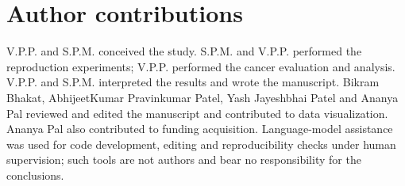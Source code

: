 \section*{Author contributions}
V.P.P. and S.P.M. conceived the study. S.P.M. and V.P.P. performed the reproduction experiments; V.P.P. performed the cancer evaluation and analysis. V.P.P. and S.P.M. interpreted the results and wrote the manuscript. Bikram Bhakat, AbhijeetKumar Pravinkumar Patel, Yash Jayeshbhai Patel and Ananya Pal reviewed and edited the manuscript and contributed to data visualization. Ananya Pal also contributed to funding acquisition. Language-model assistance was used for code development, editing and reproducibility checks under human supervision; such tools are not authors and bear no responsibility for the conclusions.

